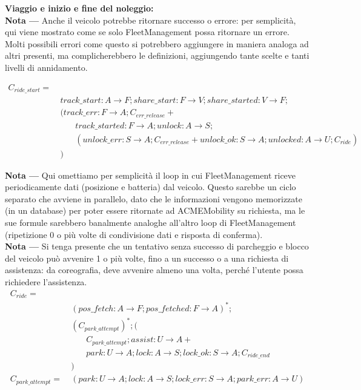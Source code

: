 \textbf{Viaggio e inizio e fine del noleggio:}\\
\textbf{Nota ---} Anche il veicolo potrebbe ritornare successo o errore: per
semplicità, qui viene mostrato come se solo FleetManagement possa ritornare un
errore. Molti possibili errori come questo si potrebbero aggiungere in maniera
analoga ad altri presenti, ma complicherebbero le definizioni, aggiungendo tante
scelte e tanti livelli di annidamento.

\begin{align*}
C_{ride\_start} = \\
& \ track\_start: A \rightarrow F ; share\_start: F \rightarrow V ; share\_started: V \rightarrow F ; \\
& \ ( track\_err: F \rightarrow A; C_{err\_release} + \\
& \quad \quad track\_started: F \rightarrow A ; unlock: A \rightarrow S ; \\
& \quad \quad ( unlock\_err: S \rightarrow A ; C_{err\_release} + unlock\_ok: S \rightarrow A ; unlocked: A \rightarrow U ; C_{ride} ) \\
& \ )
\end{align*}

\textbf{Nota ---} Qui omettiamo per semplicità il loop in cui FleetManagement
riceve periodicamente dati (posizione e batteria) dal veicolo. Questo sarebbe un
ciclo separato che avviene in parallelo, dato che le informazioni vengono
memorizzate (in un database) per poter essere ritornate ad ACMEMobility su
richiesta, ma le sue formule sarebbero banalmente analoghe all'altro loop di
FleetManagement (ripetizione 0 o più volte di condivisione dati e risposta di
conferma).\\
\textbf{Nota ---} Si tenga presente che un tentativo senza successo di
parcheggio e blocco del veicolo può avvenire 1 o più volte, fino a un successo o
a una richiesta di assistenza: da coreografia, deve avvenire almeno una volta,
perché l'utente possa richiedere l'assistenza.\\

\begin{align*}
C_{ride} = \\
& \ (pos\_fetch: A \rightarrow F ; pos\_fetched: F \rightarrow A )^* ; \\
& \ (C_{park\_attempt})^* ; ( \\
& \quad \quad C_{park\_attempt} ; assist: U \rightarrow A + \\
& \quad \quad park: U \rightarrow A ; lock: A \rightarrow S ; lock\_ok: S \rightarrow A ; C_{ride\_end} \\
& \ ) \\
C_{park\_attempt} = & \ ( park: U \rightarrow A ; lock: A \rightarrow S ; lock\_err: S \rightarrow A ; park\_err: A \rightarrow U )
\end{align*}

